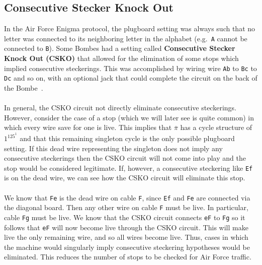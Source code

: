 \subsection{Consecutive Stecker Knock Out}
In the Air Force Enigma protocol, the plugboard setting was always
such that no letter was connected to its neighboring letter in the
alphabet (e.g.\ \texttt{A} cannot be connected to \texttt{B}). Some
Bombes had a setting called {\bf{Consecutive Stecker Knock Out
(CSKO)}} that allowed for the elimination of some stops which implied
consecutive steckerings. This was accomplished by wiring wire
\texttt{Ab} to \texttt{Bc} to \texttt{Dc} and so on, with an optional
jack that could complete the circuit on the back of the Bombe~\cite[p.~240]{BudianskyBattleOfWits2000}.
\\\\In general, the CSKO circuit not directly eliminate consecutive
steckerings. However, consider the case of a stop (which we will
later see is quite common) in which every wire save for one is live.
This implies that $\overline\pi$ has a cycle structure of $1^125^1$
and that this remaining singleton cycle is the only possible
plugboard setting. If this dead wire representing the singleton does
not imply any consecutive steckerings then the CSKO circuit will not
come into play and the stop would be considered legitimate. If,
however, a consecutive steckering like \texttt{Ef} is on the dead
wire, we can see how the CSKO circuit will eliminate this stop.
\\\\We know that \texttt{Fe} is the dead wire on cable \texttt{F},
since \texttt{Ef} and \texttt{Fe} are connected via the diagonal
board. Then any other wire on cable \texttt{F} must be live. In
particular, cable \texttt{Fg} must be live. We know that the CSKO
circuit connects \texttt{eF} to \texttt{Fg} so it follows that
\texttt{eF} will now become live through the CSKO circuit. This will
make live the only remaining wire, and so all wires become live. Thus,
cases in which the machine would singularly imply consecutive
steckering hypotheses would be eliminated. This reduces
the number of stops to be checked for Air Force traffic.

